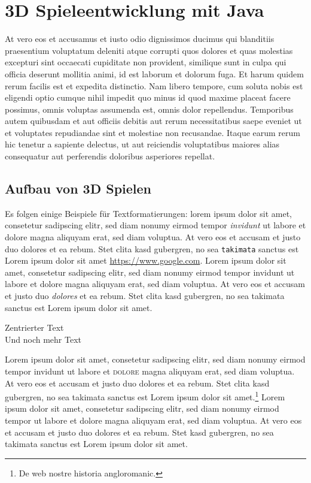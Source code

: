\chapter{3D Spieleentwicklung mit Java}\label{ch:beispiele}
At vero eos et accusamus et iusto odio dignissimos ducimus qui blanditiis praesentium voluptatum deleniti atque corrupti quos dolores et quas molestias excepturi sint occaecati cupiditate non provident, similique sunt in culpa qui officia deserunt mollitia animi, id est laborum et dolorum fuga. Et harum quidem rerum facilis est et expedita distinctio. Nam libero tempore, cum soluta nobis est eligendi optio cumque nihil impedit quo minus id quod maxime placeat facere possimus, omnis voluptas assumenda est, omnis dolor repellendus. Temporibus autem quibusdam et aut officiis debitis aut rerum necessitatibus saepe eveniet ut et voluptates repudiandae sint et molestiae non recusandae. Itaque earum rerum hic tenetur a sapiente delectus, ut aut reiciendis voluptatibus maiores alias consequatur aut perferendis doloribus asperiores repellat.

\section{Aufbau von 3D Spielen}\label{sec:textformatierungen}

Es folgen einige Beispiele für Textformatierungen: lorem ipsum dolor sit amet, consetetur sadipscing elitr, sed diam nonumy eirmod tempor \emph{invidunt} ut labore et dolore magna aliquyam erat, sed diam voluptua. At vero eos et accusam et justo duo dolores et ea rebum. Stet clita kasd gubergren, no sea \texttt{takimata} sanctus est Lorem ipsum dolor sit amet \url{https://www.google.com}. Lorem ipsum dolor sit amet, consetetur sadipscing elitr, sed diam nonumy eirmod tempor invidunt ut labore et dolore magna aliquyam erat, sed diam voluptua. At vero eos et accusam et justo duo \textit{dolores} et ea rebum. Stet clita kasd gubergren, no sea takimata sanctus est Lorem ipsum dolor sit amet.

\begin{center}
Zentrierter Text \\
Und noch mehr Text \\
\end{center}

Lorem ipsum dolor sit amet, consetetur sadipscing elitr, sed diam nonumy eirmod tempor invidunt ut labore et \textsc{dolore} magna aliquyam erat, sed diam voluptua. At vero eos et accusam et justo duo dolores et ea rebum. Stet clita kasd gubergren, no sea takimata sanctus est Lorem ipsum dolor sit amet.\footnote{De web nostre historia angloromanic.} Lorem ipsum dolor sit amet, consetetur sadipscing elitr, sed diam nonumy eirmod tempor  ut labore et dolore magna aliquyam erat, sed diam voluptua. At vero eos et accusam et justo duo dolores et ea rebum. Stet  kasd gubergren, no sea takimata sanctus est Lorem ipsum dolor sit amet.

